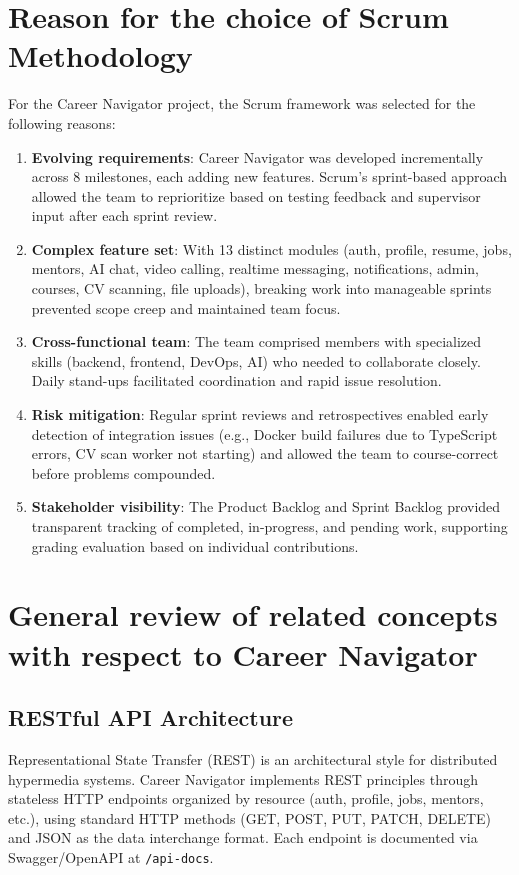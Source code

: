 \documentclass[12pt,a4paper]{report}
\begin{document}
\section{Reason for the choice of Scrum Methodology}
For the Career Navigator project, the Scrum framework was selected for the following reasons:

\begin{enumerate}[label=\textbf{R-\arabic*}:, leftmargin=*]
    \item \textbf{Evolving requirements}: Career Navigator was developed incrementally across 8 milestones, each adding new features. Scrum's sprint-based approach allowed the team to reprioritize based on testing feedback and supervisor input after each sprint review.
    \item \textbf{Complex feature set}: With 13 distinct modules (auth, profile, resume, jobs, mentors, AI chat, video calling, realtime messaging, notifications, admin, courses, CV scanning, file uploads), breaking work into manageable sprints prevented scope creep and maintained team focus.
    \item \textbf{Cross-functional team}: The team comprised members with specialized skills (backend, frontend, DevOps, AI) who needed to collaborate closely. Daily stand-ups facilitated coordination and rapid issue resolution.
    \item \textbf{Risk mitigation}: Regular sprint reviews and retrospectives enabled early detection of integration issues (e.g., Docker build failures due to TypeScript errors, CV scan worker not starting) and allowed the team to course-correct before problems compounded.
    \item \textbf{Stakeholder visibility}: The Product Backlog and Sprint Backlog provided transparent tracking of completed, in-progress, and pending work, supporting grading evaluation based on individual contributions.
\end{enumerate}

\section{General review of related concepts with respect to Career Navigator}

\subsection{RESTful API Architecture}
Representational State Transfer (REST) is an architectural style for distributed hypermedia systems. Career Navigator implements REST principles through stateless HTTP endpoints organized by resource (auth, profile, jobs, mentors, etc.), using standard HTTP methods (GET, POST, PUT, PATCH, DELETE) and JSON as the data interchange format. Each endpoint is documented via Swagger/OpenAPI at \texttt{/api-docs}.
\end{document}
